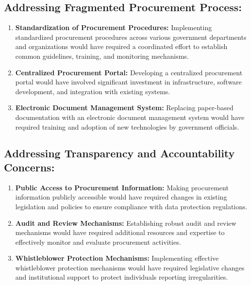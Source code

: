 \subsection{Addressing Fragmented Procurement Process:}

\begin{enumerate}
    \item \textbf{Standardization of Procurement Procedures:} Implementing standardized procurement procedures across various government departments and organizations would have required a coordinated effort to establish common guidelines, training, and monitoring mechanisms.
    
    \item \textbf{Centralized Procurement Portal:} Developing a centralized procurement portal would have involved significant investment in infrastructure, software development, and integration with existing systems.
    
    \item \textbf{Electronic Document Management System:} Replacing paper-based documentation with an electronic document management system would have required training and adoption of new technologies by government officials.
\end{enumerate}

\subsection{Addressing Transparency and Accountability Concerns:}

\begin{enumerate}
    \item \textbf{Public Access to Procurement Information:} Making procurement information publicly accessible would have required changes in existing legislation and policies to ensure compliance with data protection regulations.
    
    \item \textbf{Audit and Review Mechanisms:} Establishing robust audit and review mechanisms would have required additional resources and expertise to effectively monitor and evaluate procurement activities.
    
    \item \textbf{Whistleblower Protection Mechanisms:} Implementing effective whistleblower protection mechanisms would have required legislative changes and institutional support to protect individuals reporting irregularities.
\end{enumerate}

